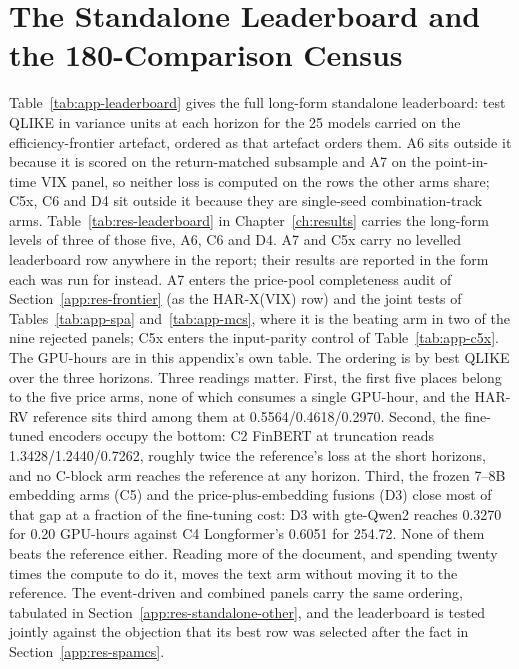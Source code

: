 \FloatBarrier
\section{The Standalone Leaderboard and the 180-Comparison Census}
\label{app:res-standalone}

Table~\ref{tab:app-leaderboard} gives the full long-form standalone
leaderboard: test QLIKE in variance units at each horizon for the 25
models carried on the efficiency-frontier artefact, ordered as that
artefact orders them. A6 sits outside it because it is scored on the
return-matched subsample and A7 on the point-in-time VIX panel, so neither
loss is computed on the rows the other arms share; C5x, C6 and D4 sit
outside it because they are single-seed combination-track arms.
Table~\ref{tab:res-leaderboard} in Chapter~\ref{ch:results} carries the
long-form levels of three of those five, A6, C6 and D4. A7 and C5x carry
no levelled leaderboard row anywhere in the report; their results are
reported in the form each was run for instead. A7 enters the price-pool
completeness audit of Section~\ref{app:res-frontier} (as the
\mbox{HAR-X(VIX)} row) and the joint tests of Tables~\ref{tab:app-spa}
and~\ref{tab:app-mcs}, where it is the beating arm in two of the nine
rejected panels; C5x enters the input-parity control of
Table~\ref{tab:app-c5x}. The GPU-hours are in this appendix's own table.
The ordering is by best QLIKE over the three horizons. Three readings matter. First, the
first five places belong to the five price arms, none of which consumes
a single GPU-hour, and the HAR-RV reference sits third
among them at 0.5564/0.4618/0.2970. Second, the fine-tuned
encoders occupy the bottom: C2 FinBERT at truncation reads
1.3428/1.2440/0.7262, roughly twice the reference's loss at the short
horizons, and no C-block arm reaches the reference at any horizon.
Third, the frozen 7--8B embedding arms (C5) and the price-plus-embedding
fusions (D3) close most of that gap at a fraction of the fine-tuning
cost: D3 with gte-Qwen2 reaches 0.3270 for 0.20 GPU-hours against
C4 Longformer's 0.6051 for 254.72. None of them beats the
reference either. Reading more of the document, and spending twenty
times the compute to do it, moves the text arm without moving it to the
reference.
The event-driven and combined panels carry the same ordering, tabulated in
Section~\ref{app:res-standalone-other}, and the leaderboard is tested jointly
against the objection that its best row was selected after the fact in
Section~\ref{app:res-spamcs}.


